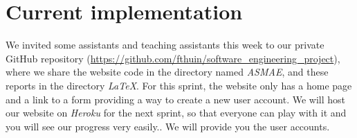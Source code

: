 
\section{Current implementation}

We invited some assistants and teaching assistants this week to our private GitHub repository
(\url{https://github.com/fthuin/software_engineering_project}), where we
share the website code in the directory named \textit{ASMAE}, and these reports in the
directory \textit{LaTeX}. For this sprint, the website only has a home page
and a link to a form providing a way to create a new user account. We will host
our website on \textit{Heroku} for the next sprint, so that everyone can play with it
and you will see our progress very easily.. We will provide you the user accounts.
